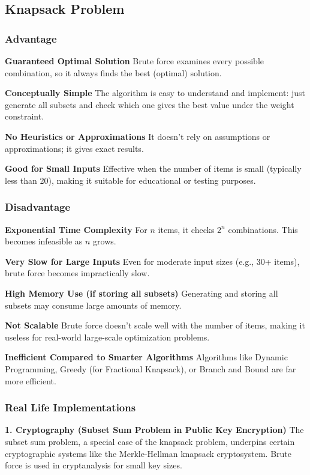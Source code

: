 \subsection{Knapsack Problem}

\subsubsection{Advantage}
\textbf{Guaranteed Optimal Solution} 
Brute force examines every possible combination, so it always finds the best (optimal) solution. 

\textbf{Conceptually Simple} 
The algorithm is easy to understand and implement: just generate all subsets and check which one gives the best value under the weight constraint. 

\textbf{No Heuristics or Approximations} 
It doesn’t rely on assumptions or approximations; it gives exact results. 

\textbf{Good for Small Inputs} 
Effective when the number of items is small (typically less than 20), making it suitable for educational or testing purposes. 

\subsubsection{Disadvantage}
\textbf{Exponential Time Complexity} 
For $n$ items, it checks $2^n$ combinations. This becomes infeasible as $n$ grows. 

\textbf{Very Slow for Large Inputs} 
Even for moderate input sizes (e.g., 30+ items), brute force becomes impractically slow. 

\textbf{High Memory Use (if storing all subsets)} 
Generating and storing all subsets may consume large amounts of memory. 

\textbf{Not Scalable} 
Brute force doesn’t scale well with the number of items, making it useless for real-world large-scale optimization problems. 

\textbf{Inefficient Compared to Smarter Algorithms} 
Algorithms like Dynamic Programming, Greedy (for Fractional Knapsack), or Branch and Bound are far more efficient. 

\subsubsection{Real Life Implementations}

\textbf{1. Cryptography (Subset Sum Problem in Public Key Encryption) }
The subset sum problem, a special case of the knapsack problem, underpins certain cryptographic systems like the Merkle-Hellman knapsack cryptosystem. Brute force is used in cryptanalysis for small key sizes. 

